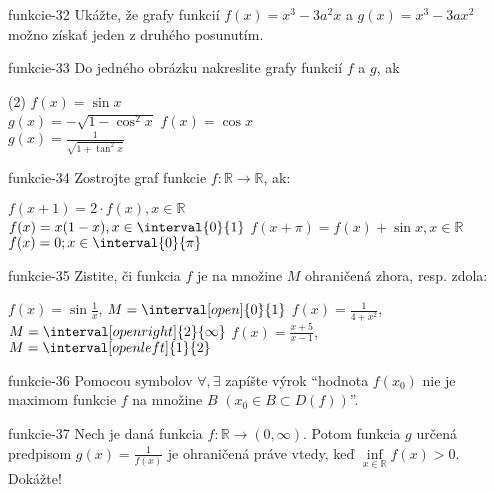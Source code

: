 \begin{defproblem}{funkcie-32}
Ukážte, že grafy funkcií $f(x)=x^3-3a^2x$ a $g(x)=x^3-3ax^2$ možno získať jeden z druhého posunutím.
\end{defproblem}

\begin{defproblem}{funkcie-33}
Do jedného obrázku nakreslite grafy funkcií $f$ a $g$, ak
\begin{tasks}(2)
  \task
    $ f(x)=\sin x $ \\
    $ g(x)=-\sqrt{1-\cos^2 x} $
  \task
    $ f(x)=\cos x $ \\
    $ g(x)=\frac{1}{\sqrt{1+\tan^2 x}} $
\end{tasks}
\end{defproblem}

\begin{defproblem}{funkcie-34}
Zostrojte graf funkcie $f:\mathbb{R} \rightarrow \mathbb{R}$, ak:
\begin{tasks}
  \task
    $ f(x+1) = 2 \cdot f(x), x \in \mathbb{R} $ \\
    $ f(x) = x(1-x), x \in \interval{0}{1} $
  \task
    $ f(x+\pi)=f(x) + \sin{x}, x \in \mathbb{R} $ \\
    $ f(x) = 0; x \in \interval{0}{\pi} $
\end{tasks}
\end{defproblem}

\begin{defproblem}{funkcie-35}
Zistite, či funkcia $f$ je na množine $M$ ohraničená zhora, resp. zdola:
\begin{tasks}
  \task
      $f(x) = \sin\frac{1}{x}$,
      $M = \interval[open]{0}{1}$
  \task
    $f(x) = \frac{1}{4+x^2}$,
    $M = \interval[open right]{2}{\infty}$
  \task
    $f(x)=\frac{x+5}{x-1}$,
    $M = \interval[open left]{1}{2}$
\end{tasks}
\end{defproblem}

\begin{defproblem}{funkcie-36}
Pomocou symbolov $\forall,\exists$ zapíšte výrok \enquote{hodnota $f(x_0)$ nie je
maximom funkcie $f$ na množine $B$ $(x_0\in B\subset D(f))$}.
\end{defproblem}

\begin{defproblem}{funkcie-37}
Nech je daná funkcia $f:\mathbb{R}\rightarrow(0,\infty)$. Potom funkcia $g$
určená predpisom $g(x)=\frac{1}{f(x)}$ je ohraničená práve vtedy, keď
$\inf\limits_{x\in\mathbb{R}}f(x)>0$. Dokážte!
\end{defproblem}

